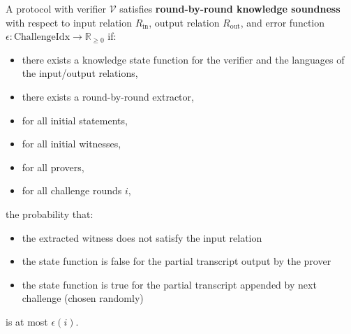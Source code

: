 \begin{definition}
    \label{def:round_by_round_knowledge_soundness}
    A protocol with verifier $\mathcal{V}$ satisfies \textbf{round-by-round knowledge soundness} with respect to input
    relation $R_{\text{in}}$, output relation $R_{\text{out}}$, and error function $\epsilon: \text{ChallengeIdx} \to \mathbb{R}_{\geq 0}$ if:
    \begin{itemize}
        \item there exists a knowledge state function for the verifier and the languages of the input/output relations,
        \item there exists a round-by-round extractor,
        \item for all initial statements,
        \item for all initial witnesses,
        \item for all provers,
        \item for all challenge rounds $i$,
    \end{itemize}
    the probability that:
    \begin{itemize}
        \item the extracted witness does not satisfy the input relation
        \item the state function is false for the partial transcript output by the prover
        \item the state function is true for the partial transcript appended by next challenge (chosen randomly)
    \end{itemize}
    is at most $\epsilon(i)$.
\end{definition}


